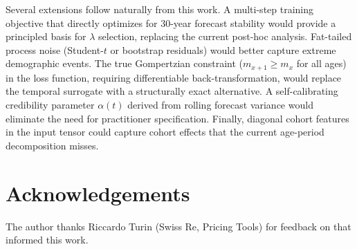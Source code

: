 \documentclass[11pt,a4paper]{article}
\begin{document}
Several extensions follow naturally from this work. A multi-step training objective that directly optimizes for 30-year forecast stability would provide a principled basis for $\lambda$ selection, replacing the current post-hoc analysis. Fat-tailed process noise (Student-$t$ or bootstrap residuals) would better capture extreme demographic events. The true Gompertzian constraint ($m_{x+1} \geq m_x$ for all ages) in the loss function, requiring differentiable back-transformation, would replace the temporal surrogate with a structurally exact alternative. A self-calibrating credibility parameter $\alpha(t)$ derived from rolling forecast variance would eliminate the need for practitioner specification. Finally, diagonal cohort features in the input tensor could capture cohort effects that the current age-period decomposition misses.

\section*{Acknowledgements}
The author thanks Riccardo Turin (Swiss Re, Pricing Tools) for feedback on \cite{rindori2026p04} that informed this work.

\newpage


\end{document}
